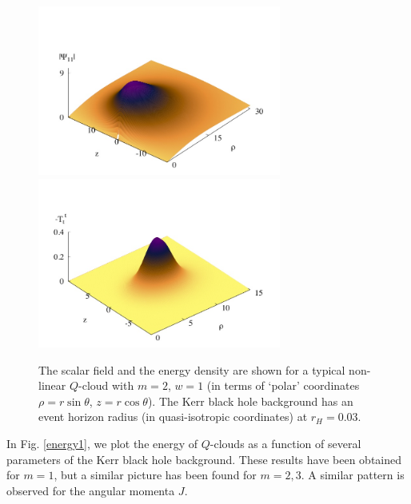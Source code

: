 \begin{figure}[h!]
\centering
\includegraphics[height=2.2in]{papers/QClouds/Z-3d.jpeg}
\includegraphics[height=2.2in]{papers/QClouds/E-3d.jpeg}
\caption{The scalar field and the energy density are shown for a typical
 non-linear $Q$-cloud with $m=2$, $w =1$ (in terms of `polar' coordinates $\rho=r\sin \theta$,
 $z=r \cos \theta$).
The Kerr black hole background has an event horizon radius (in quasi-isotropic coordinates) at
 $r_H=0.03$. 
} 
\label{densities}
\end{figure}

In Fig. \ref{energy1}, we plot the energy 
of $Q$-clouds as a function of several parameters of the Kerr black hole background. These results have been obtained for $m=1$, but a similar picture has been found for $m=2,3$. A similar pattern is observed for the angular momenta $J$.

